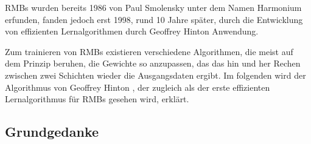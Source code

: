 RMBs wurden bereits 1986 von Paul Smolensky  unter dem Namen Harmonium erfunden, fanden jedoch erst 1998, rund 10 Jahre später, durch die Entwicklung von effizienten Lernalgorithmen durch Geoffrey Hinton Anwendung.

Zum trainieren von RMBs existieren verschiedene Algorithmen, die meist auf dem Prinzip beruhen, die Gewichte so anzupassen, das das hin und her Rechen zwischen zwei Schichten wieder die Ausgangsdaten ergibt. Im folgenden wird der Algorithmus von Geoffrey Hinton , der zugleich als der erste effizienten Lernalgorithmus für RMBs gesehen wird, erklärt. 

\subsection{Grundgedanke}

